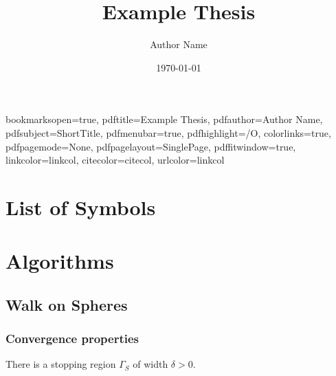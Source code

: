 

\hypersetup
{
bookmarksopen=true,
pdftitle=Example Thesis,
pdfauthor=Author Name,
pdfsubject=ShortTitle, %
pdfmenubar=true, %
pdfhighlight=/O, %
colorlinks=true, %
pdfpagemode=None, %
pdfpagelayout=SinglePage, %
pdffitwindow=true, %
linkcolor=linkcol, %
citecolor=citecol, %
urlcolor=linkcol %
}

\title{Example Thesis}
\author{Author Name}
\date{\today}

%
%

\frontmatter
\maketitle

\tableofcontents
\newpage
\chapter*{List of Symbols\hfill}%
\listofsymbols

\mainmatter
\chapter{Algorithms}
\label{cha:algorithms}

\section{Walk on Spheres}
\label{sec:walk_on_spheres}

\subsection{Convergence properties} %
\label{sub:convergence_properties}
There is a stopping region $\Gamma_S$  of width $\delta>0$. 
\cite{Muller}

\backmatter

%
%



